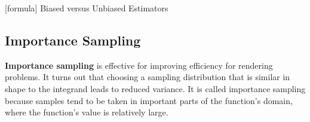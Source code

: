 [formula] 
Biased versus Unbiased Estimators

\subsection{Importance Sampling}

\textbf{Importance sampling} is effective for improving efficiency for rendering problems. It turns out that choosing a sampling distribution that is similar in shape to the integrand leads to reduced variance. It is called importance sampling because samples tend to be taken in important parts of the function's domain, where the function's value is relatively large.



